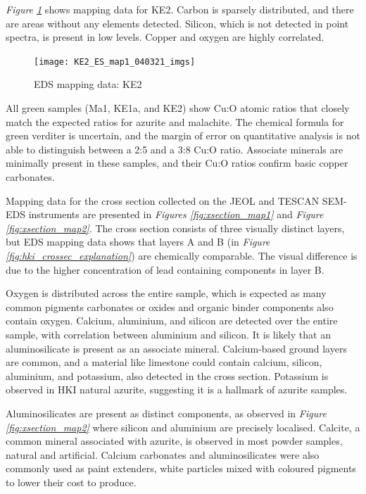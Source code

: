 \textit{Figure \ref{fig:ke2_map1}} shows mapping data for KE2. Carbon is sparsely distributed, and there are areas without any elements detected. Silicon, which is not detected in point spectra, is present in low levels. Copper and oxygen are highly correlated.

\begin{figure}[H]
\centering
  \texttt{[image: KE2\_ES\_map1\_040321\_imgs]}
\caption[EDS mapping data: KE2]{EDS mapping data: KE2}
\label{fig:ke2_map1}
\end{figure}


All green samples (Ma1, KE1a, and KE2) show Cu:O atomic ratios that closely match the expected ratios for azurite and malachite. The chemical formula for green verditer is uncertain, and the margin of error on quantitative analysis is not able to distinguish between a 2:5 and a 3:8 Cu:O ratio. Associate minerals are minimally present in these samples, and their Cu:O ratios confirm basic copper carbonates.


Mapping data for the cross section collected on the JEOL and TESCAN SEM-EDS instruments are presented in \textit{Figures \ref{fig:xsection_map1}} and \textit{Figure \ref{fig:xsection_map2}}. The cross section consists of three visually distinct layers, but EDS mapping data shows that layers A and B (in \textit{Figure \ref{fig:hki_crossec_explanation}}) are chemically comparable. The visual difference is due to the higher concentration of lead containing components in layer B. 

Oxygen is distributed across the entire sample, which is expected as many common pigments carbonates or oxides and organic binder components also contain oxygen. Calcium, aluminium, and silicon are detected over the entire sample, with correlation between aluminium and silicon. It is likely that an aluminosilicate is present as an associate mineral. Calcium-based ground layers are common, and a material like limestone could contain calcium, silicon, aluminium, and potassium, also detected in the cross section. Potassium is observed in HKI natural azurite, suggesting it is a hallmark of azurite samples.

Aluminosilicates are present as distinct components, as observed in \textit{Figure \ref{fig:xsection_map2}} where silicon and aluminium are precisely localised. Calcite, a common mineral associated with azurite, is observed in most powder samples, natural and artificial. Calcium carbonates and aluminosilicates were also commonly used as paint extenders, white particles mixed with coloured pigments to lower their cost to produce.~\autocite{Townsend}

